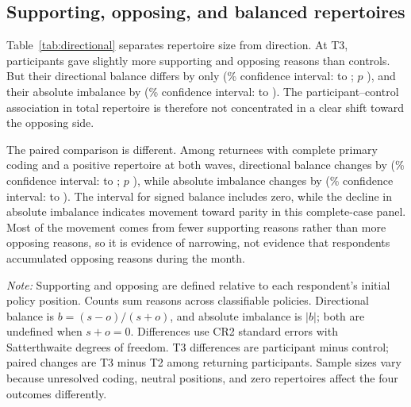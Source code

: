 \documentclass{article}
\begin{document}
\subsection{Supporting, opposing, and balanced repertoires}

Table~\ref{tab:directional} separates repertoire size from direction. At T3, participants gave
slightly more supporting and opposing reasons than controls. But their directional balance
differs by only \BalanceDifference{} (\ConfidenceLevel\% confidence interval: \BalanceLow{} to
\BalanceHigh{}; $p$ \BalanceP), and their absolute imbalance by \AbsoluteDifference{}
(\ConfidenceLevel\% confidence interval: \AbsoluteLow{} to \AbsoluteHigh{}). The
participant--control association in total repertoire is therefore not concentrated in a clear
shift toward the opposing side.

The paired comparison is different. Among returnees with complete primary coding and a
positive repertoire at both waves, directional balance changes by
\PairedBalanceDifference{} (\ConfidenceLevel\% confidence interval:
\PairedBalanceLow{} to \PairedBalanceHigh{}; $p$ \PairedBalanceP), while absolute imbalance
changes by \PairedAbsoluteDifference{} (\ConfidenceLevel\% confidence interval:
\PairedAbsoluteLow{} to \PairedAbsoluteHigh{}). The interval for signed balance includes zero,
while the decline in absolute imbalance indicates movement toward parity in this complete-case panel. Most of the movement comes from fewer supporting reasons rather than more
opposing reasons, so it is evidence of narrowing, not evidence that respondents accumulated
opposing reasons during the month.

\begin{table}[htbp]
\centering
\small
\caption{Supporting and opposing argument repertoires}
\label{tab:directional}
\resizebox{\textwidth}{!}{%

}
\begin{minipage}{\textwidth}
\smallskip\footnotesize
\textit{Note:} Supporting and opposing are defined relative to each respondent's initial
policy position. Counts sum reasons across classifiable policies. Directional balance is
$b=(s-o)/(s+o)$, and absolute imbalance is $|b|$; both are undefined when $s+o=0$.
Differences use CR2 standard errors with Satterthwaite degrees of freedom. T3 differences are
participant minus control; paired changes are T3 minus T2 among returning participants. Sample
sizes vary because unresolved coding, neutral positions, and zero repertoires affect the four
outcomes differently.
\end{minipage}
\end{table}
\end{document}
